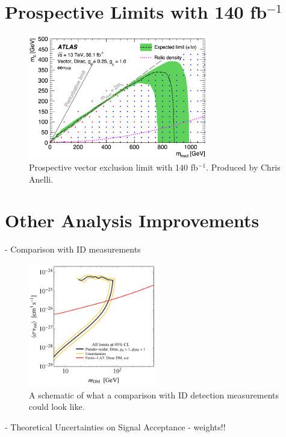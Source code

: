\section{Prospective Limits with 140 fb$^{-1}$}

\begin{figure}[htb]
\centering
\includegraphics[width=0.7\textwidth]{Figures/140ifb.png}
\caption{Prospective vector exclusion limit with 140 fb$^{-1}$. Produced by Chris Anelli.}
\label{fig:id}
\end{figure}

\section{Other Analysis Improvements}
- Comparison with ID measurements

\begin{figure}[htb]
\centering
\includegraphics[width=0.5\textwidth]{Figures/id.png}
\caption{A schematic of what a comparison with ID detection measurements could look like.}
\label{fig:id}
\end{figure}

- Theoretical Uncertainties on Signal Acceptance - weights!!